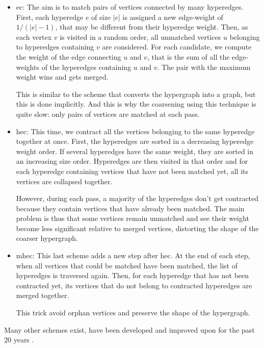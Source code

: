 \documentclass[11pt,a4paper]{report} %
\theoremstyle{customdef}
\begin{document}
\begin{itemize}
	\item \gls{ec}: The aim is to match pairs of vertices connected by many hyperedges.
	First, each hyperedge $e$ of size $|e|$ is assigned a new edge-weight of $1/(|e|-1)$, that may be different from their hyperedge weight.
	Then, as each vertex $v$ is visited in a random order, all unmatched vertices $u$ belonging to hyperedges containing $v$ are considered.
	For each candidate, we compute the weight of the edge connecting $u$ and $v$, that is the sum of all the edge-weights of the hyperedges containing $u$ and $v$.
	The pair with the maximum weight wins and gets merged.

	This is similar to the scheme that converts the hypergraph into a graph, but this is done implicitly.
	And this is why the coarsening using this technique is quite slow: only pairs of vertices are matched at each pass.
	\item \gls{hec}: This time, we contract all the vertices belonging to the same hyperedge together at once.
	First, the hyperedges are sorted in a decreasing hyperedge weight order.
	If several hyperedges have the same weight, they are sorted in an increasing size order.
	Hyperedges are then visited in that order and for each hyperedge containing vertices that have not been matched yet, all its vertices are collapsed together.

	However, during each pass, a majority of the hyperedges don't get contracted because they contain vertices that have already been matched.
	The main problem is thus that some vertices remain unmatched and see their weight become less significant relative to merged vertices, distorting the shape of the coarser hypergraph.
	\item \gls{mhec}: This last scheme adds a new step after \gls{hec}.
	At the end of each step, when all vertices that could be matched have been matched, the list of hyperedges is traversed again.
	Then, for each hyperedge that has not been contracted yet, its vertices that do not belong to contracted hyperedges are merged together.

	This trick avoid orphan vertices and preserve the shape of the hypergraph.
\end{itemize}

Many other schemes exist, have been developed and improved upon for the past 20 years \citep{Aykanat2008, Karypis1995b, Lotfifar2015, Monien2000}.
\end{document}
